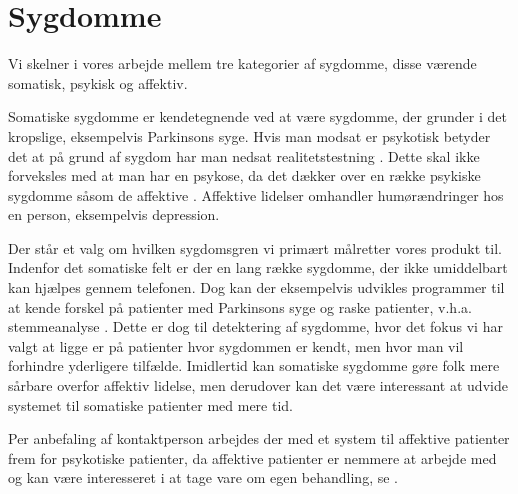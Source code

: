 \section{Sygdomme}
Vi skelner i vores arbejde mellem tre kategorier af sygdomme, disse værende somatisk, psykisk og affektiv.

Somatiske sygdomme er kendetegnende ved at være sygdomme, der grunder i det kropslige, eksempelvis Parkinsons syge.
Hvis man modsat er psykotisk betyder det at på grund af sygdom har man nedsat realitetstestning \citep{misc:netpsykpsykose}.
Dette skal ikke forveksles med at man har en psykose, da det dækker over en række psykiske sygdomme såsom de affektive \citep{misc:netpsykpsykose}.
Affektive lidelser omhandler humørændringer hos en person, eksempelvis depression.

Der står et valg om hvilken sygdomsgren vi primært målretter vores produkt til.
Indenfor det somatiske felt er der en lang række sygdomme, der ikke umiddelbart kan hjælpes gennem telefonen.
Dog kan der eksempelvis udvikles programmer til at kende forskel på patienter med Parkinsons syge og raske patienter, v.h.a. stemmeanalyse \citep{6168572}.
Dette er dog til detektering af sygdomme, hvor det fokus vi har valgt at ligge er på patienter hvor sygdommen er kendt, men hvor man vil forhindre yderligere tilfælde.
Imidlertid kan somatiske sygdomme gøre folk mere sårbare overfor affektiv lidelse, men derudover kan det være interessant at udvide systemet til somatiske patienter med mere tid.

Per anbefaling af kontaktperson \citet{misc:janne-rasmussen} arbejdes der med et system til affektive patienter frem for psykotiske patienter, da affektive patienter er nemmere at arbejde med og kan være interesseret i at tage vare om egen behandling, se .
